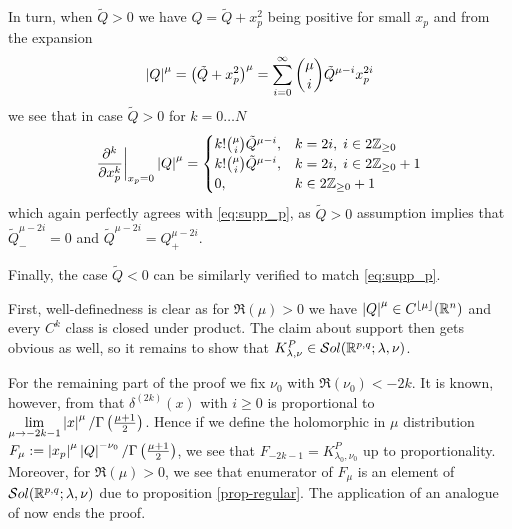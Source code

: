 \documentclass[10pt]{article} %
\theoremstyle{definition}
\theoremstyle{remark}
\begin{document}
\begin{myproof}
	In turn, when $\tilde{Q}>0$ we have $Q=\tilde{Q}+x_p^2$ being positive for small $x_p$ and from the expansion
	\[\myabs{Q}^\mu=\mybra{\tilde{Q}+x_p^2}^\mu=\sum_{i=0}^\infty\binom{\mu}{i}\tilde{Q}^{\mu-i}x_p^{2i}\]
	we see that in case $\tilde{Q}>0$ for $k=0\dots N$
	\begin{equation*}\frac{\partial^k}{\partial x_p^k}\bigg|_{x_p=0}\left|Q\right|^{\mu}=\begin{cases}
			k!\binom{\mu}{i}{\tilde{Q}^{\mu-i}},&k=2i,\;i\in2\mathbb{Z}_{\ge0}\\
			k!\binom{\mu}{i}{\tilde{Q}^{\mu-i}},&k=2i,\;i\in2\mathbb{Z}_{\ge0}+1\\
			0,&k\in2\mathbb{Z}_{\ge0}+1
	\end{cases}\end{equation*}
which again perfectly agrees with \eqref{eq:supp_p}, as $\tilde{Q}>0$ assumption implies that $\tilde{Q}^{\mu-2i}_-=0
$ and $\tilde{Q}^{\mu-2i}=Q_{+}^{\mu-2i}$.

Finally, the case $\tilde{Q}<0$ can be similarly verified to match \eqref{eq:supp_p}.
\end{myproof}
\begin{myproof}
	First, well-definedness is clear 
	as for $\Re(\mu)>0$ we have $\left|Q\right|^{\mu}\in C^{\left\lfloor\mu\right\rfloor}(\mathbb{R}^n)$ and every $C^k$ class is closed under product.
	The claim about support then gets obvious as well, so it remains to show that $K_{\lambda,\nu
	}^P\in\mathcal{S}ol(\mathbb{R}^{p,q};\lambda,\nu)$.

	For the remaining part of the proof we fix $\nu_0$ with $\Re(\nu_0)<-2k$.
	It is known, however, from \cite[ch. I, sec. 3.5]{gelfand1980distribution}
	that $\delta^{(2k)}(x)$ with $i\geq0$ is proportional to $\lim_{\mu\to-2k-1}\myabs{x}^{\mu}/\Gamma\left( \frac{\mu+1}{2}
	\right)$. Hence if we
	define the holomorphic in $\mu$ distribution ${F}_{\mu}:=\left|x_p\right|^{\mu}\left|{Q}\right|^{-\nu_0}/\Gamma\left( \frac{\mu
	+1}{2} \right)$, we see that ${F}_{-2k-1}=K_{\lambda_0,\nu_0}^P$ up to proportionality. Moreover, for $\Re(\mu)>0$,
	we see that enumerator of $F_{\mu}$ is an element of $\mathcal{S}ol(\mathbb{R}^{p,q};\lambda,\nu)$ due to proposition \ref{prop-regular}.
	The application of an analogue of \cite[prop. 3.18]{kobayashi2015symmetry} now ends the proof.
\end{myproof}
\end{document}
